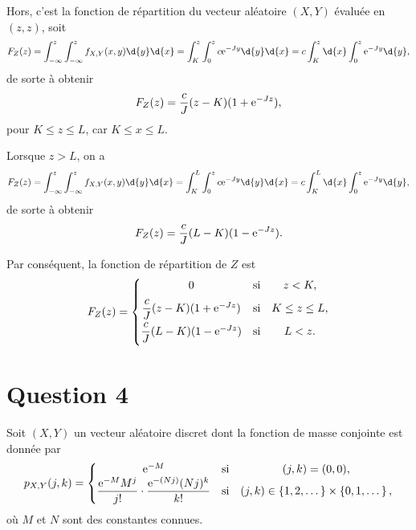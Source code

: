 \documentclass[11pt]{article}
\newcommand\e{%
    \ensuremath{%
        \mathrm{e}%
    }%
}
\begin{document}
Hors, c'est la fonction de répartition du vecteur aléatoire $(X,Y)$ évaluée
en $(z,z)$, soit
\begin{equation*}
    F_Z(z)
    =\int_{-\infty}^z\int_{-\infty}^zf_{X,Y}(x,y)\d{y}\d{x}
    =\int_K^z\int_0^zc\e^{-Jy}\d{y}\d{x}
    =c\int_K^z\d{x}\int_0^z\e^{-Jy}\d{y},
\end{equation*}
de sorte à obtenir
\begin{equation*}
    F_Z(z)
    =\frac{c}{J}(z-K)(1+\e^{-Jz}),
\end{equation*}
pour $K\leq z\leq L$, car $K\leq x\leq L$.

Lorsque $z>L$, on a
\begin{equation*}
    F_Z(z)
    =\int_{-\infty}^z\int_{-\infty}^zf_{X,Y}(x,y)\d{y}\d{x}
    =\int_K^L\int_0^zc\e^{-Jy}\d{y}\d{x}
    =c\int_K^L\d{x}\int_0^z\e^{-Jy}\d{y},
\end{equation*}
de sorte à obtenir
\begin{equation*}
    F_Z(z)
    =\frac{c}{J}(L-K)(1-\e^{-Jz}).
\end{equation*}

Par conséquent, la fonction de répartition de $Z$ est
\begin{equation*}
    F_Z(z)=\left\{
        \begin{matrix}
            0                             & \text{si} &       z  <  K,\\[6pt]
            \dfrac{c}{J}(z-K)(1+\e^{-Jz}) & \text{si} & K\leq z\leq L,\\[6pt]
            \dfrac{c}{J}(L-K)(1-\e^{-Jz}) & \text{si} & L  <  z.      \\[6pt]
        \end{matrix}
    \right.
\end{equation*}

\pagebreak
\section*{Question 4}
Soit $(X,Y)$ un vecteur aléatoire discret dont la fonction de masse conjointe
est donnée par
\begin{equation*}
    p_{X,Y}(j,k)=\left\{
        \begin{matrix}
            \e^{-M} & \text{si} & (j,k)=(0,0),\\
            \dfrac{\e^{-M}M^j}{j!}\cdot\dfrac{\e^{-(Nj)}(Nj)^k}{k!}
                & \text{si} & (j,k)\in\left\{1,2,\dots\right\}
                \times \left\{0,1,\dots\right\},\\
        \end{matrix}
    \right.
\end{equation*}
où $M$ et $N$ sont des constantes connues.
\end{document}
